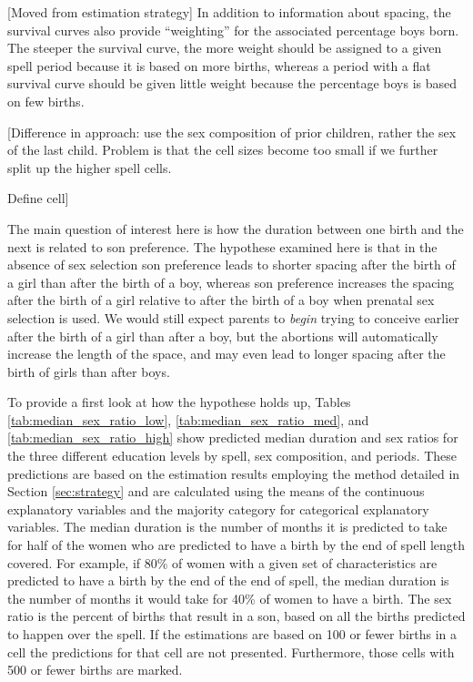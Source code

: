 \documentclass[12pt,letterpaper]{article}
\begin{document}
[Moved from estimation strategy]
In addition to information about spacing, the survival curves also provide 
``weighting'' for the associated percentage boys born.
The steeper the survival curve, the more weight should be assigned to a given
spell period because it is based on more births, 
whereas a period with a flat survival curve should be given little weight because the 
percentage boys is based on few births.


[Difference in approach: use the sex composition of prior
children, rather the sex of the last child.
Problem is that the cell sizes become too small if we further split up
the higher spell cells.

Define cell]


The main question of interest here is how the duration between one
birth and the next is related to son preference.
The hypothese examined here is that in the absence of sex selection son 
preference leads to shorter spacing after the birth of a girl than after the 
birth of a boy, whereas son preference increases the spacing after the birth 
of a girl relative to after the birth of a boy when prenatal sex selection is 
used.
We would still expect parents to \emph{begin} trying to conceive earlier
after the birth of a girl than after a boy, but the abortions will automatically
increase the length of the space, and may even lead to longer spacing after the
birth of girls than after boys.

To provide a first look at how the hypothese holds up, Tables 
\ref{tab:median_sex_ratio_low},
\ref{tab:median_sex_ratio_med}, and
\ref{tab:median_sex_ratio_high}
show predicted median duration and sex ratios for the three different
education levels by spell, sex composition, and periods.
These predictions are based on the estimation results employing the method 
detailed in Section \ref{sec:strategy} and are calculated using the means of 
the continuous explanatory variables and the majority category for categorical 
explanatory variables.
The median duration is the number of months it is predicted to take for
half of the women who are predicted to have a birth by the end of spell length
covered.
For example, if 80\% of women with a given set of characteristics are predicted to
have a birth by the end of the end of spell, the median duration is the number of
months it would take for 40\% of women to have a birth.
The sex ratio is the percent of births that result in a son, based on all the 
births predicted to happen over the spell.
If the estimations are based on 100 or fewer births in a cell the predictions
for that cell are not presented.
Furthermore, those cells with 500 or fewer births are marked.
\end{document}

